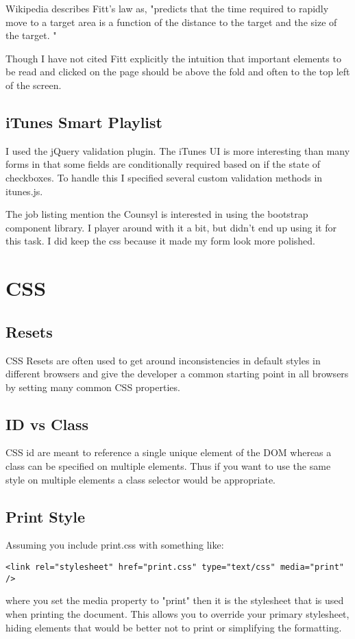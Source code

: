 \documentclass[12pt]{amsart}
\begin{document}
Wikipedia describes Fitt's law as, "predicts that the time required to rapidly move to a target area is a function of the distance to the target and the size of the target. "

Though I have not cited Fitt explicitly the intuition that important elements to be read and clicked on the page should be above the fold and often to the top left of the screen.

\subsection{iTunes Smart Playlist}

I used the jQuery validation plugin. The iTunes UI is more interesting than many forms in that some fields are conditionally required based on if the state of checkboxes. To handle this I specified several custom validation methods in itunes.js.

The job listing mention the Counsyl is interested in using the bootstrap component library. I player around with it a bit, but didn't end up using it for this task. I did keep the css because it made my form look more polished.

\section{CSS}

\subsection{Resets}

CSS Resets are often used to get around inconsistencies in default styles in different browsers and give the developer a common starting point in all browsers by setting many common CSS properties.

\subsection{ID vs Class}
CSS id are meant to reference a single unique element of the DOM whereas a class can be specified on multiple elements. Thus if you want to use the same style on multiple elements a class selector would be appropriate.

\subsection{Print Style}
Assuming you include print.css with something like:
\begin{verbatim}
<link rel="stylesheet" href="print.css" type="text/css" media="print" /> 
\end{verbatim}
where you set the media property to "print" then it is the stylesheet that is used when printing the document. This allows you to override your primary stylesheet, hiding elements that would be better not to print or simplifying the formatting.
\end{document}
